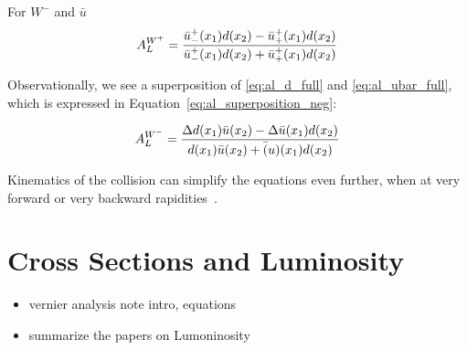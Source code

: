 For $W^-$ and $\bar{u}$
\begin{equation}
  {A_L^{W^+}} = 
  {
    {\bar{u}_-^+(x_1)d(x_2)-\bar{u}_+^+(x_1)d(x_2)}
    \over
    {\bar{u}_-^+(x_1)d(x_2)+\bar{u}_+^+(x_1)d(x_2)}
  }  
  \label{eq:al_ubar_full}
\end{equation}

Observationally, we see a superposition of \ref{eq:al_d_full} and
\ref{eq:al_ubar_full}, which is expressed in
Equation~\ref{eq:al_superposition_neg}:

\begin{equation}
  {A_L^{W^-}} = 
  {
    {
      \Delta d(x_1)\bar{u}(x_2)-\Delta \bar{u}(x_1)d(x_2)
    }
    \over
    {
      d(x_1)\bar u(x_2)+\bar(u)(x_1)d(x_2)
    }
  }
  \label{eq:al_superposition_neg}
\end{equation}

Kinematics of the collision can simplify the equations even further, when at
very forward or very backward rapidities~\cite{Aidala2005}.

\clearpage
\section{Cross Sections and Luminosity}
\begin{itemize}
		\item vernier analysis note intro, equations
		\item summarize the papers on Lumoninosity
\end{itemize}

\clearpage
